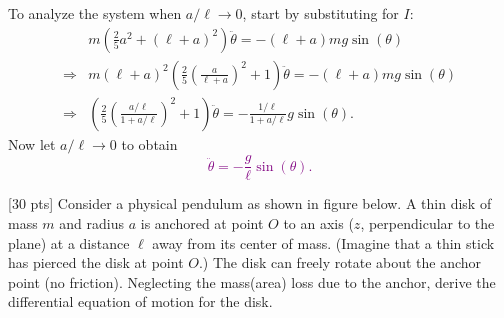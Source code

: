 \documentclass[12pt]{article}
\begin{document}
\begin{ex}
\begin{solution}
  To analyze the system when $a/\ell\to0$, start by substituting for $I$:
  \begin{align*}
    &m\left(\tfrac{2}{5}a^2+(\ell+a)^2\right)\ddot{\theta}=-(\ell+a)mg\sin(\theta)\\
    \Rightarrow& m(\ell+a)^2\left(\frac{2}{5}\left(\frac{a}{\ell+a}\right)^2+1\right)\ddot{\theta}=-(\ell+a)mg\sin(\theta)\\
    \Rightarrow& \left(\frac{2}{5}\left(\frac{a/\ell}{1+a/\ell}\right)^2+1\right)\ddot{\theta}=-\frac{1/\ell}{1+a/\ell}g\sin(\theta).
  \end{align*}
  Now let $a/\ell\to 0$ to obtain\textcolor{purple}{
  $$\ddot{\theta}=-\frac{g}{\ell}\sin(\theta).$$}%
\end{solution}
\end{ex}

\begin{ex}

  [30 pts] Consider a physical pendulum as shown in figure below. A thin disk of mass $m$ and radius $a$ is anchored at point $O$ to an axis ($z$, perpendicular to the plane) at a distance $\ell$ away from its center of mass. (Imagine that a thin stick has pierced the disk at point $O$.) The disk can freely rotate about the anchor point (no friction). Neglecting the mass(area) loss due to the anchor, derive the differential equation of motion for the disk.
  
\begin{figure}[!h]
\begin{center}
\end{center}
\end{figure}
\end{ex}
\end{document}
